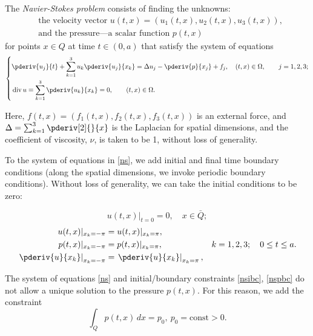 \documentclass{article}
\DeclareMathOperator{\divr}{div}
\numberwithin{equation}{section}
\begin{document}
The \emph{Navier-Stokes problem} consists of finding the unknowns:
\begin{align*}
&\text{the velocity vector } u(t,x) = (u_1(t,x), u_2(t,x), u_3(t,x)),\\
&\text{and the pressure---a scalar function } p(t,x)
\end{align*}
for points $x \in Q$ at time $t \in (0, a)$ that satisfy the system of
equations
\begin{equation}\label{ns}
    \left\{
    \begin{aligned}
        &\pderiv{u_j}{t} + \sum_{k=1}^{3} u_k \pderiv{u_j}{x_k} = \Delta u_j -
        \pderiv{p}{x_j} + f_j, \quad (t,x) \in \Omega, \qquad j = 1,2,3;\\
       &\divr u \equiv \sum_{k=1}^{3} \pderiv{u_k}{x_k} = 0,\qquad (t,x) \in \Omega.
    \end{aligned}
    \right.
\end{equation}

Here, $f(t,x) = (f_1(t,x), f_2(t,x), f_3(t,x))$ is an external force, and 
$\Delta = \sum_{k=1}^{3} \pderiv[2]{}{x}$ is the Laplacian for spatial
dimensions, and the coefficient of viscosity, $\nu$, is taken to be 1, without
loss of generality.

To the system of equations in \eqref{ns}, we add initial and final time
boundary conditions (along the spatial dimensions, we invoke periodic boundary
conditions).  Without loss of generality, we can take the initial conditions
to be zero:

\begin{equation}
    u(t,x)\rvert_{t=0}=0, \quad x\in \bar{Q};
    \label{nsibc}
\end{equation}
\begin{align}
    u(t,x)\rvert_{x_k=-\pi} &= u(t,x)\rvert_{x_k = \pi},\nonumber\\
    p(t,x)\rvert_{x_k=-\pi} &= p(t,x)\rvert_{x_k = \pi},
    &k=1,2,3; \quad 0\leq t \leq a. \label{nspbc} \\
    \left.\pderiv{u}{x_k}\right\rvert_{x_k=-\pi} &=
    \left.\pderiv{u}{x_k}\right\rvert_{x_k = \pi},\nonumber
\end{align}

The system of equations \eqref{ns} and initial/boundary constraints
\eqref{nsibc}, \eqref{nspbc} do not allow a unique solution to the pressure
$p(t,x)$. For this reason, we add the constraint
\begin{equation}
    \int_Q p(t,x)\,dx = p_0,\ p_0 = \text{const} > 0.
    \label{nspc}
\end{equation}
\end{document}
